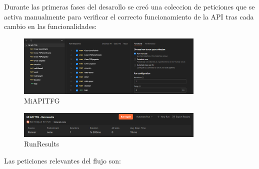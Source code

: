 Durante las primeras fases del desarollo se creó una coleccion de peticiones que se activa manualmente para verificar el correcto funcionamiento de la API tras cada cambio en las funcionalidades:

\begin{figure}[H]
  \centering
  \includegraphics[width=0.8\textwidth]{Imagenes/MiAPITFG.png}
  \caption{MiAPITFG}
  \label{fig:MiAPITFG}
\end{figure}

\begin{figure}[H]
  \centering
  \includegraphics[width=0.8\textwidth]{Imagenes/RunResults.png}
  \caption{RunResults}
  \label{fig:RunResults}
\end{figure}

Las peticiones relevantes del flujo  son:


